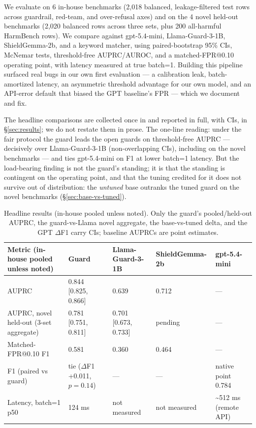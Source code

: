 \documentclass[sigconf,nonacm]{acmart}
\begin{document}
We evaluate on 6 in-house benchmarks (2,018 balanced, leakage-filtered test rows across guardrail, red-team, and over-refusal axes) and on the 4 novel held-out benchmarks (2,020 balanced rows across three sets, plus 200 all-harmful HarmBench rows). We compare against gpt-5.4-mini, Llama-Guard-3-1B, ShieldGemma-2b, and a keyword matcher, using paired-bootstrap 95\% CIs, McNemar tests, threshold-free AUPRC/AUROC, and a matched-FPR@0.10 operating point, with latency measured at true batch=1. Building this pipeline surfaced real bugs in our own first evaluation --- a calibration leak, batch-amortized latency, an asymmetric threshold advantage for our own model, and an API-error default that biased the GPT baseline's FPR --- which we document and fix.

The headline comparisons are collected once in  and reported in full, with CIs, in \S\ref{sec:results}; we do not restate them in prose. The one-line reading: under the fair protocol the guard leads the open guards on threshold-free AUPRC --- decisively over Llama-Guard-3-1B (non-overlapping CIs), including on the novel benchmarks --- and ties gpt-5.4-mini on F1 at lower batch=1 latency. But the load-bearing finding is not the guard's standing; it is that the standing is contingent on the operating point, and that the tuning credited for it does not survive out of distribution: the \emph{untuned} base outranks the tuned guard on the novel benchmarks (\S\ref{sec:base-vs-tuned}).

\begin{table}[t]
  \centering
  \small
  \caption{Headline results (in-house pooled unless noted). Only the guard's pooled/held-out AUPRC, the guard-vs-Llama novel aggregate, the base-vs-tuned delta, and the GPT $\Delta$F1 carry CIs; baseline AUPRCs are point estimates.}
  \label{tab:headline}
  \begin{tabular}{lllll}
    \toprule
    Metric (in-house pooled unless noted) & Guard & Llama-Guard-3-1B & ShieldGemma-2b & gpt-5.4-mini \\
    \midrule
    AUPRC & 0.844 [0.825, 0.866] & 0.639 & 0.712 & --- \\
    AUPRC, novel held-out (3-set aggregate) & 0.781 [0.751, 0.811] & 0.701 [0.673, 0.733] & pending & --- \\
    Matched-FPR@0.10 F1 & 0.581 & 0.360 & 0.464 & --- \\
    F1 (paired vs guard) & tie ($\Delta$F1 +0.011, $p=0.14$) & --- & --- & native point 0.784 \\
    Latency, batch=1 p50 & 124 ms & not measured & not measured & \textasciitilde{}512 ms (remote API) \\
    \bottomrule
  \end{tabular}
\end{table}
\end{document}

